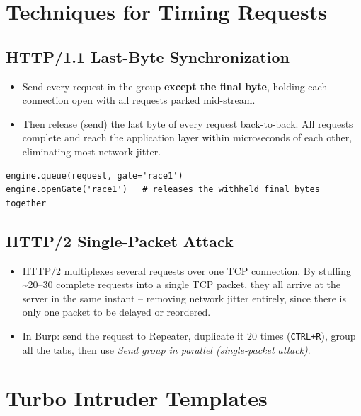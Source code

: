 \documentclass[11pt]{article}
\begin{document}
\section{Techniques for Timing Requests}

\subsection{HTTP/1.1 Last-Byte Synchronization}
\begin{itemize}[leftmargin=1.2em]
  \item Send every request in the group \textbf{except the final byte}, holding each connection open with all requests parked mid-stream.
  \item Then release (send) the last byte of every request back-to-back. All requests complete and reach the application layer within microseconds of each other, eliminating most network jitter.
\end{itemize}
\begin{lstlisting}[style=code]
engine.queue(request, gate='race1')
engine.openGate('race1')   # releases the withheld final bytes together
\end{lstlisting}

\subsection{HTTP/2 Single-Packet Attack}
\begin{itemize}[leftmargin=1.2em]
  \item HTTP/2 multiplexes several requests over one TCP connection. By stuffing \textasciitilde20--30 complete requests into a single TCP packet, they all arrive at the server in the same instant -- removing network jitter entirely, since there is only one packet to be delayed or reordered.
  \item In Burp: send the request to Repeater, duplicate it 20 times (\texttt{CTRL+R}), group all the tabs, then use \textit{Send group in parallel (single-packet attack)}.
\end{itemize}

\section{Turbo Intruder Templates}
\end{document}
